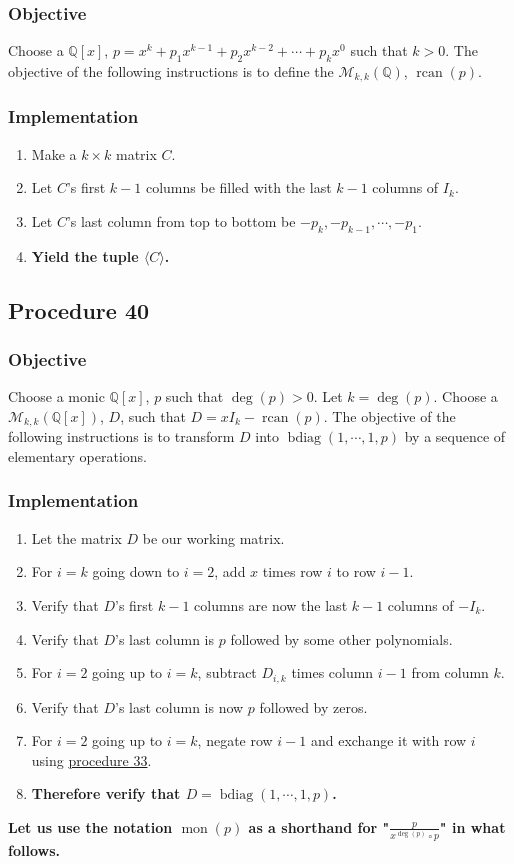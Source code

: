 \documentclass[twocolumn]{article}
\DeclareMathOperator{\bdiag}{bdiag}
\DeclareMathOperator{\rcan}{rcan}
\DeclareMathOperator{\mon}{mon}
\begin{document}
			\subsubsection{Objective}
				Choose a $\mathbb{Q}[x]$, $p=x^k+p_1x^{k-1}+p_2x^{k-2}+\cdots+p_kx^0$ such that $k>0$. The objective of the following instructions is to define the $\mathcal{M}_{k,k}(\mathbb{Q})$, $\rcan(p)$.
			\subsubsection{Implementation}
				\begin{enumerate}
					\item Make a $k\times k$ matrix $C$.
					\item Let $C$'s first $k-1$ columns be filled with the last $k-1$ columns of $I_k$.
					\item Let $C$'s last column from top to bottom be $-p_k, -p_{k-1},\cdots,-p_1$.
					\item \textbf{Yield the tuple $\langle C\rangle$.}
				\end{enumerate}
		\subsection{Procedure 40}\label{sec:procedure 40}
			\subsubsection{Objective}
				Choose a monic $\mathbb{Q}[x]$, $p$ such that $\deg(p)>0$. Let $k=\deg(p)$. Choose a $\mathcal{M}_{k,k}(\mathbb{Q}[x])$, $D$, such that $D=xI_k-\rcan(p)$. The objective of the following instructions is to transform $D$ into $\bdiag(1,\cdots,1,p)$ by a sequence of elementary operations.
			\subsubsection{Implementation}
				\begin{enumerate}
					\item Let the matrix $D$ be our working matrix.
					\item For $i=k$ going down to $i=2$, add $x$ times row $i$ to row $i-1$.
					\item Verify that $D$'s first $k-1$ columns are now the last $k-1$ columns of $-I_k$.
					\item Verify that $D$'s last column is $p$ followed by some other polynomials.
					\item For $i=2$ going up to $i=k$, subtract $D_{i, k}$ times column $i-1$ from column $k$.
					\item Verify that $D$'s last column is now $p$ followed by zeros.
					\item For $i=2$ going up to $i=k$, negate row $i-1$ and exchange it with row $i$ using \hyperref[sec:procedure 33]{procedure 33}.
					\item \textbf{Therefore verify that $D=\bdiag(1,\cdots,1,p)$.}
				\end{enumerate}
		\textbf{Let us use the notation $\mon(p)$ as a shorthand for "$\frac{p}{x^{\deg(p)}\circ p}$" in what follows.}
\end{document}

